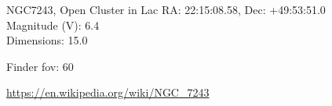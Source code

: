 \begin{block}{NGC7243, Open Cluster in Lac}
    RA: 22:15:08.58, Dec: +49:53:51.0 \\ 
    Magnitude (V): 6.4 \\ 
    Dimensions: 15.0 

    Finder fov: 60 

    \url{https://en.wikipedia.org/wiki/NGC_7243} 
\end{block}